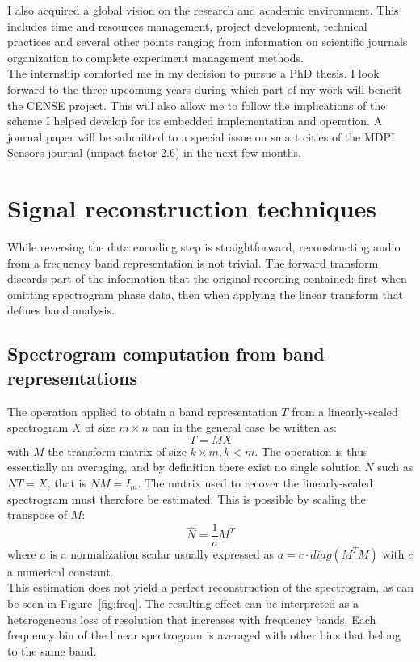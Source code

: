 \documentclass[12pt,times,onecolumn]{article}
\begin{document}
I also acquired a global vision on the research and academic environment. This includes time and resources management, project development, technical practices and several other points ranging from information on scientific journals organization to complete experiment management methods.\\

The internship comforted me in my decision to pursue a PhD thesis. I look forward to the three upcomung years during which part of my work will benefit the CENSE project. This will also allow me to follow the implications of the scheme I helped develop for its embedded implementation and operation. A journal paper will be submitted to a special issue on smart cities of the MDPI Sensors journal (impact factor 2.6) in the next few months.

\clearpage
\appendix
\section{Signal reconstruction techniques}
\label{sigrec}
While reversing the data encoding step is straightforward, reconstructing audio from a frequency band representation is not trivial. The forward transform discards part of the information that the original recording contained: first when omitting spectrogram phase data, then when applying the linear transform that defines band analysis.
\subsection{Spectrogram computation from band representations}
The operation applied to obtain a band representation $T$ from a linearly-scaled spectrogram $X$ of size $m\times n$ can in the general case be written as:
\begin{equation}
T = MX
\end{equation}
with $M$ the transform matrix of size $k\times m, k<m$. The operation is thus essentially an averaging, and by definition there exist no single solution $N$ such as $NT = X$, that is $NM = I_m$. The matrix used to recover the linearly-scaled spectrogram must therefore be estimated. This is possible by scaling the transpose of $M$:
\begin{equation}
\hat{N} = \frac{1}{a}M^T
\end{equation}
where $a$ is a normalization scalar usually expressed as $a = c\cdot diag(M^TM)$ with $c$ a numerical constant.\\

This estimation does not yield a perfect reconstruction of the spectrogram, as can be seen in Figure~\ref{fig:freq}. The resulting effect can be interpreted as a heterogeneous loss of resolution that increases with frequency bands. Each frequency bin of the linear spectrogram is averaged with other bins that belong to the same band.
\end{document}
